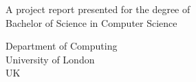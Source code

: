 \makeatletter
\begin{titlepage}
   \begin{center}
       \vspace*{1cm}

       \Huge
       \textbf{\projectTitle}

       \vspace{0.5cm}
       \Large
       \projectSubtitle
            
       \vspace{1.5cm}

       \textbf{\projectAuthor}

       \vfill
            
       A project report presented for the degree of\\
       Bachelor of Science in Computer Science
            
       \vspace{0.8cm}
     
       \Large
       Department of Computing\\
       University of London\\
       UK\\
       \projectDate
       
   \end{center}
\end{titlepage}
\makeatother
